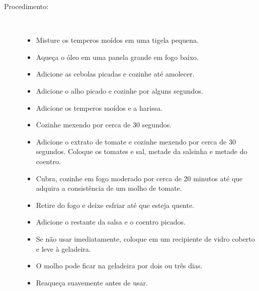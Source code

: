 \documentclass [11pt, papel de carta] {article}
\begin{document}
\begin {description}
\item [Procedimento:] \ \\
\begin {itemize}
\item Misture os temperos moídos em uma tigela pequena.
\item Aqueça o óleo em uma panela grande em fogo baixo.
\item Adicione as cebolas picadas e cozinhe até amolecer.
\item Adicione o alho picado e cozinhe por alguns segundos.
\item Adicione os temperos moídos e a harissa.
\item Cozinhe mexendo por cerca de 30 segundos.
\item Adicione o extrato de tomate e cozinhe mexendo por cerca de 30 segundos.
Coloque os tomates e sal, metade da salsinha e metade do coentro.
\item Cubra, cozinhe em fogo moderado por cerca de 20 minutos até que adquira a consistência de um molho de tomate.
\item Retire do fogo e deixe esfriar até que esteja quente.
\item Adicione o restante da salsa e o coentro picados.
\item Se não usar imediatamente, coloque em um recipiente de vidro coberto e leve à geladeira.
\item O molho pode ficar na geladeira por dois ou três dias.
\item Reaqueça suavemente antes de usar.
\end {itemize}
\end {description}
\end{document}
